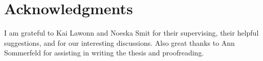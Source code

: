 \documentclass[crop=false]{standalone}
\begin{document}


  \section*{Acknowledgments}
  \thispagestyle{empty}
  I am grateful to Kai Lawonn and Noeska Smit for their supervising, their helpful suggestions, and for our interesting discussions.
  Also great thanks to Ann Sommerfeld for assisting in writing the thesis and proofreading.
  \restoregeometry
\end{document}
